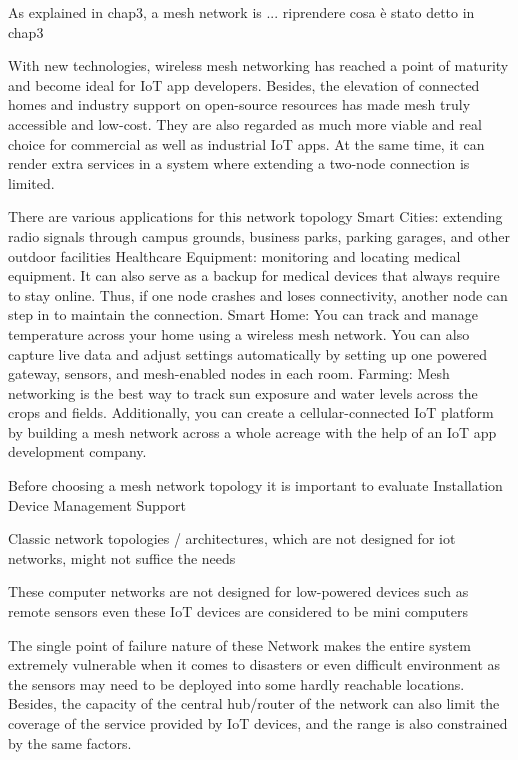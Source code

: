 		As explained in chap3, a mesh network is ... riprendere cosa è stato detto in chap3
		
		
		With new technologies, wireless mesh networking has reached a point of maturity and become ideal for IoT app developers. Besides, the elevation of connected homes and industry support on open-source resources has made mesh truly accessible and low-cost. They are also regarded as much more viable and real choice for commercial as well as industrial IoT apps. At the same time, it can render extra services in a system where extending a two-node connection is limited.
		
		There are various applications for this network topology
		Smart Cities: extending radio signals through campus grounds, business parks, parking garages, and other outdoor facilities
		Healthcare Equipment: monitoring and locating medical equipment. It can also serve as a backup for medical devices that always require to stay online. Thus, if one node crashes and loses connectivity, another node can step in to maintain the connection.
		Smart Home: You can track and manage temperature across your home using a wireless mesh network. You can also capture live data and adjust settings automatically by setting up one powered gateway, sensors, and mesh-enabled nodes in each room.
		Farming: Mesh networking is the best way to track sun exposure and water levels across the crops and fields. Additionally, you can create a cellular-connected IoT platform by building a mesh network across a whole acreage with the help of an IoT app development company.
	
		Before choosing a mesh network topology it is important to evaluate
		Installation
		Device Management
		Support
	
		Classic network topologies / architectures, which are not designed for iot networks, might not suffice the needs
		
		These computer 
		networks  are  not  designed  for  low-powered  devices  such  as 
		remote  sensors  even  these  IoT  devices  are  considered  to  be 
		mini  computers
		
		The  single  point  of  failure  nature  of  these  
		Network makes the entire system extremely vulnerable when it 
		comes to disasters or even difficult environment as the sensors 
		may need to be deployed into some hardly reachable locations.
		Besides,  the  capacity  of  the  central  hub/router  of  the  network  
		can  also  limit  the  coverage  of  the  service  provided  by  IoT  
		devices,  and the range is  also constrained by  the  same  factors.
	
